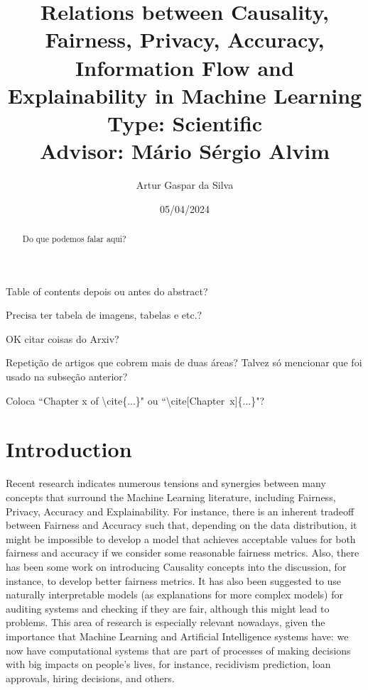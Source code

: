 \documentclass{article}
\title{Relations between Causality, Fairness, Privacy, Accuracy, Information Flow and Explainability in Machine Learning\large\\ Type: Scientific\\Advisor: Mário Sérgio Alvim}
\author{Artur Gaspar da Silva}
\date{05/04/2024}
\newcommand{\qm}[1]{``#1"}
\begin{document}
\maketitle

{\color{orange} Table of contents depois ou antes do abstract?}

{\color{orange} Precisa ter tabela de imagens, tabelas e etc.?}

{\color{orange} OK citar coisas do Arxiv?}

{\color{orange} Repetição de artigos que cobrem mais de duas áreas? Talvez só mencionar que foi usado na subseção anterior?}

{\color{orange} Coloca \qm{Chapter x of \textbackslash cite\{...\}} ou \qm{\textbackslash cite[Chapter~x]\{...\}}?}

\begin{abstract}
    Do que podemos falar aqui?
\end{abstract}

\tableofcontents

\section{Introduction}

Recent research\cite{Sok}\cite{Reductions}\cite{Rachel}\cite{Awareness} indicates numerous tensions and synergies between many concepts that surround the Machine Learning literature, including Fairness, Privacy, Accuracy and Explainability. For instance, there is an inherent tradeoff between Fairness and Accuracy such that, depending on the data distribution, it might be impossible to develop a model that achieves acceptable values for both fairness and accuracy if we consider some reasonable fairness metrics\cite{Carlos}. Also, there has been some work on introducing Causality concepts into the discussion, for instance, to develop better fairness metrics\cite{CausalFair}. It has also been suggested to use naturally interpretable models (as explanations for more complex models) for auditing systems and checking if they are fair, although this might lead to problems\cite{ExplainAll}. This area of research is especially relevant nowadays, given the importance that Machine Learning and Artificial Intelligence systems have: we now have computational systems that are part of processes of making decisions with big impacts on people's lives, for instance, recidivism prediction\cite{Compass}, loan approvals\cite{Loans}, hiring decisions\cite{Jobs}, and others.
\end{document}
